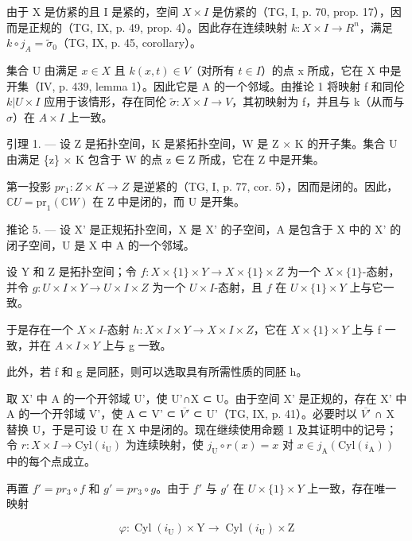 由于 X 是仿紧的且 I 是紧的，空间 \(X \times I\) 是仿紧的（TG, I, p. 70, prop. 17），因而是正规的（TG, IX, p. 49, prop. 4）。因此存在连续映射 \(k: X \times I \to R^{n}\)，满足 \(k \circ j_{A} = \widetilde{\sigma}_{0}\)（TG, IX, p. 45, corollary）。

集合 U 由满足 \(x \in X\) 且 \(k(x, t) \in V\)（对所有 \(t \in I\)）的点 x 所成，它在 X 中是开集（IV, p. 439, lemma 1）。因此它是 A 的一个邻域。由推论 1 将映射 f 和同伦 \(k | U \times I\) 应用于该情形，存在同伦 \(\widetilde{\sigma} \colon X \times I \to V\)，其初映射为 f，并且与 k（从而与 \(\sigma\)）在 \(A \times I\) 上一致。

引理 1. — 设 Z 是拓扑空间，K 是紧拓扑空间，W 是 Z × K 的开子集。集合 U 由满足 \{z\} × K 包含于 W 的点 z ∈ Z 所成，它在 Z 中是开集。

第一投影 \(pr_{1}: Z \times K \to Z\) 是逆紧的（TG, I, p. 77, cor. 5），因而是闭的。因此，\(\mathbb{C}U = \mathrm{pr}_{1}(\mathbb{C}W)\) 在 Z 中是闭的，而 U 是开集。

推论 5. --- 设 X' 是正规拓扑空间，X 是 X' 的子空间，A 是包含于 X 中的 X' 的闭子空间，U 是 X 中 A 的一个邻域。

设 Y 和 Z 是拓扑空间；令 \(f\colon X \times \{1\} \times Y \to X \times \{1\} \times Z\) 为一个 \(X \times \{1\}\)-态射，并令 \(g\colon U \times I \times Y \to U \times I \times Z\) 为一个 \(U \times I\)-态射，且 \(f\) 在 \(U \times \{1\} \times Y\) 上与它一致。

于是存在一个 \(X \times I\)-态射 \(h: X \times I \times Y \to X \times I \times Z\)，它在 \(X \times \{1\} \times Y\) 上与 f 一致，并在 \(A \times I \times Y\) 上与 g 一致。

此外，若 f 和 g 是同胚，则可以选取具有所需性质的同胚 h。

取 X' 中 A 的一个开邻域 U'，使 U'∩X ⊂ U。由于空间 X' 是正规的，存在 X' 中 A 的一个开邻域 V'，使 A ⊂ V' ⊂ \(\overline{V'}\) ⊂ U'（TG, IX, p. 41）。必要时以 \(\overline{V'}\) ∩ X 替换 U，于是可设 U 在 X 中是闭的。现在继续使用命题 1 及其证明中的记号；令 \(r: X \times I \to \text{Cyl}(i_{\text{U}})\) 为连续映射，使 \(j_{\text{U}} \circ r(x) = x\) 对 \(x \in j_{\text{A}}(\text{Cyl}(i_{\text{A}}))\) 中的每个点成立。

再置 \(f' = pr_{3} \circ f\) 和 \(g' = pr_{3} \circ g\)。由于 \(f'\) 与 \(g'\) 在 \(U \times \{1\} \times Y\) 上一致，存在唯一映射

\[
\varphi \colon \operatorname{Cyl} (i _ {\mathrm{U}}) \times \mathrm{Y} \to \operatorname{Cyl} (i _ {\mathrm{U}}) \times \mathrm{Z}
\]

